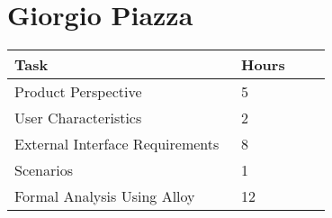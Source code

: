 \section{Giorgio Piazza}
\vspace{2mm}
\begin{center}
	\begin{tabular}{@{}p{0.5\linewidth} p{0.2\linewidth}@{}}
		\hline
		\textbf{Task} & \textbf{Hours} \\ \hline
		Product Perspective & 5 \\ \hline
		User Characteristics & 2 \\ \hline
		External Interface Requirements & 8 \\ \hline
		Scenarios & 1\\ \hline
		Formal Analysis Using Alloy & 12 \\ \hline
	\end{tabular}
\end{center}